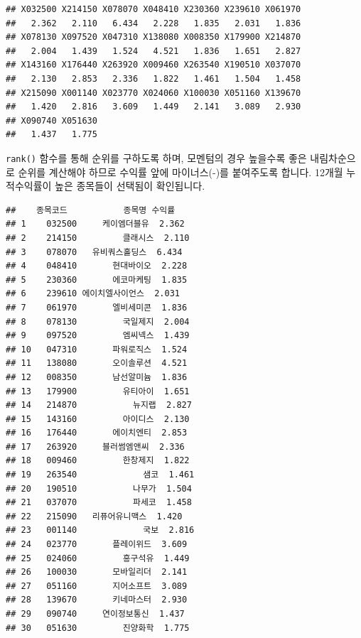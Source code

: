 \documentclass[12pt,]{book}
\newenvironment{Shaded}{\begin{snugshade}}{\end{snugshade}}
\newcommand{\DataTypeTok}[1]{\textcolor[rgb]{0.13,0.29,0.53}{#1}}
\newcommand{\DecValTok}[1]{\textcolor[rgb]{0.00,0.00,0.81}{#1}}
\newcommand{\KeywordTok}[1]{\textcolor[rgb]{0.13,0.29,0.53}{\textbf{#1}}}
\newcommand{\NormalTok}[1]{#1}
\newcommand{\OperatorTok}[1]{\textcolor[rgb]{0.81,0.36,0.00}{\textbf{#1}}}
\newcommand{\StringTok}[1]{\textcolor[rgb]{0.31,0.60,0.02}{#1}}
\begin{document}
\begin{verbatim}
## X032500 X214150 X078070 X048410 X230360 X239610 X061970 
##   2.362   2.110   6.434   2.228   1.835   2.031   1.836 
## X078130 X097520 X047310 X138080 X008350 X179900 X214870 
##   2.004   1.439   1.524   4.521   1.836   1.651   2.827 
## X143160 X176440 X263920 X009460 X263540 X190510 X037070 
##   2.130   2.853   2.336   1.822   1.461   1.504   1.458 
## X215090 X001140 X023770 X024060 X100030 X051160 X139670 
##   1.420   2.816   3.609   1.449   2.141   3.089   2.930 
## X090740 X051630 
##   1.437   1.775
\end{verbatim}

\texttt{rank()} 함수를 통해 순위를 구하도록 하며, 모멘텀의 경우 높을수록 좋은 내림차순으로 순위를 계산해야 하므로 수익률 앞에 마이너스(-)를 붙여주도록 합니다. 12개월 누적수익률이 높은 종목들이 선택됨이 확인됩니다.

\begin{Shaded}
\end{Shaded}

\begin{verbatim}
##    종목코드           종목명 수익률
## 1    032500     케이엠더블유  2.362
## 2    214150         클래시스  2.110
## 3    078070   유비쿼스홀딩스  6.434
## 4    048410       현대바이오  2.228
## 5    230360       에코마케팅  1.835
## 6    239610 에이치엘사이언스  2.031
## 7    061970       엘비세미콘  1.836
## 8    078130         국일제지  2.004
## 9    097520         엠씨넥스  1.439
## 10   047310       파워로직스  1.524
## 11   138080       오이솔루션  4.521
## 12   008350       남선알미늄  1.836
## 13   179900         유티아이  1.651
## 14   214870           뉴지랩  2.827
## 15   143160         아이디스  2.130
## 16   176440       에이치엔티  2.853
## 17   263920     블러썸엠앤씨  2.336
## 18   009460         한창제지  1.822
## 19   263540             샘코  1.461
## 20   190510           나무가  1.504
## 21   037070           파세코  1.458
## 22   215090   리퓨어유니맥스  1.420
## 23   001140             국보  2.816
## 24   023770       플레이위드  3.609
## 25   024060         흥구석유  1.449
## 26   100030       모바일리더  2.141
## 27   051160       지어소프트  3.089
## 28   139670       키네마스터  2.930
## 29   090740     연이정보통신  1.437
## 30   051630         진양화학  1.775
\end{verbatim}
\end{document}
